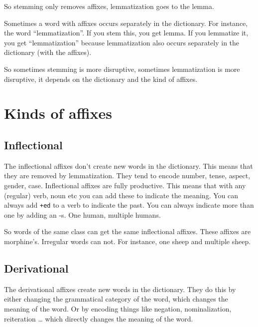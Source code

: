 \documentclass[
  11pt,
  british,
]{article}
\begin{document}
So stemming only removes affixes, lemmatization goes to the lemma.

Sometimes a word with affixes occurs separately in the dictionary. For
instance, the word ``lemmatization''. If you stem this, you get lemma.
If you lemmatize it, you get ``lemmatization'' because lemmatization
also occurs separately in the dictionary (with the affixes).

So sometimes stemming is more disruptive, sometimes lemmatization is
more disruptive, it depends on the dictionary and the kind of affixes.

\hypertarget{kinds-of-affixes}{%
\section{Kinds of affixes}\label{kinds-of-affixes}}

\hypertarget{inflectional}{%
\subsection{Inflectional}\label{inflectional}}

The inflectional affixes don't create new words in the dictionary. This
means that they are removed by lemmatization. They tend to encode
number, tense, aspect, gender, case. Inflectional affixes are fully
productive. This means that with any (regular) verb, noun etc you can
add these to indicate the meaning. You can always add \texttt{+ed} to a
verb to indicate the past. You can always indicate more than one by
adding an -s. One human, multiple humans.

So words of the same class can get the same inflectional affixes. These
affixes are morphine's. Irregular words can not. For instance, one sheep
and multiple sheep.

\hypertarget{derivational}{%
\subsection{Derivational}\label{derivational}}

The derivational affixes create new words in the dictionary. They do
this by either changing the grammatical category of the word, which
changes the meaning of the word. Or by encoding things like negation,
nominalization, reiteration \ldots{} which directly changes the meaning
of the word.
\end{document}
